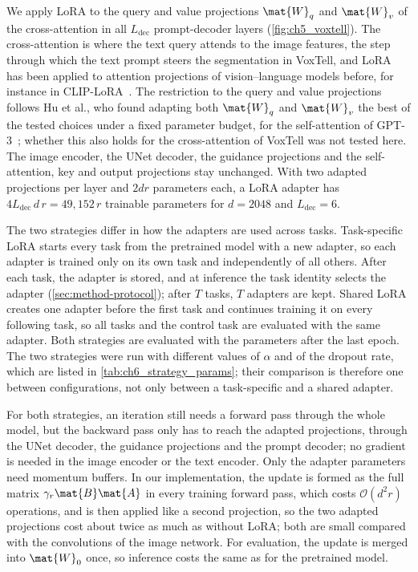 We apply LoRA to the query and value projections $\mat{W}_q$ and $\mat{W}_v$ of the cross-attention in all $L_{\mathrm{dec}}$ prompt-decoder layers (\cref{fig:ch5_voxtell}).
The cross-attention is where the text query attends to the image features, the step through which the text prompt steers the segmentation in VoxTell, and LoRA has been applied to attention projections of vision--language models before, for instance in CLIP-LoRA~\cite{zanella2024lowrankfewshotadaptationvisionlanguage}.
The restriction to the query and value projections follows Hu et al., who found adapting both $\mat{W}_q$ and $\mat{W}_v$ the best of the tested choices under a fixed parameter budget, for the self-attention of GPT-3~\cite[Sec.~7.1, Table~5]{hu2022lora}; whether this also holds for the cross-attention of VoxTell was not tested here.
The image encoder, the UNet decoder, the guidance projections and the self-attention, key and output projections stay unchanged.
With two adapted projections per layer and $2dr$ parameters each, a LoRA adapter has $4 L_{\mathrm{dec}}\, d\, r = 49{,}152\, r$ trainable parameters for $d = 2048$ and $L_{\mathrm{dec}} = 6$.

The two strategies differ in how the adapters are used across tasks.
Task-specific LoRA starts every task from the pretrained model with a new adapter, so each adapter is trained only on its own task and independently of all others.
After each task, the adapter is stored, and at inference the task identity selects the adapter (\cref{sec:method-protocol}); after $T$ tasks, $T$ adapters are kept.
Shared LoRA creates one adapter before the first task and continues training it on every following task, so all tasks and the control task are evaluated with the same adapter.
Both strategies are evaluated with the parameters after the last epoch.
The two strategies were run with different values of $\alpha$ and of the dropout rate, which are listed in \cref{tab:ch6_strategy_params}; their comparison is therefore one between configurations, not only between a task-specific and a shared adapter.

For both strategies, an iteration still needs a forward pass through the whole model, but the backward pass only has to reach the adapted projections, through the UNet decoder, the guidance projections and the prompt decoder; no gradient is needed in the image encoder or the text encoder.
Only the adapter parameters need momentum buffers.
In our implementation, the update is formed as the full matrix $\gamma_r\mat{B}\mat{A}$ in every training forward pass, which costs $\mathcal{O}(d^2 r)$ operations, and is then applied like a second projection, so the two adapted projections cost about twice as much as without LoRA; both are small compared with the convolutions of the image network.
For evaluation, the update is merged into $\mat{W}_0$ once, so inference costs the same as for the pretrained model.

